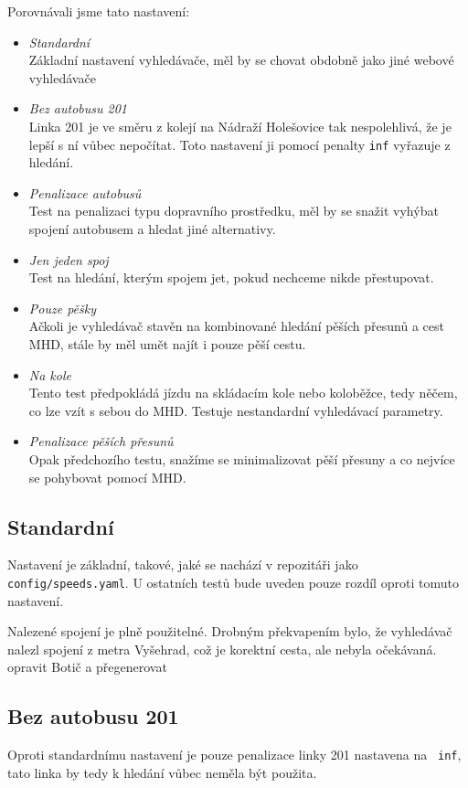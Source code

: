 Porovnávali jsme tato nastavení:
\begin{itemize}
	\item {\em Standardní}\\Základní nastavení vyhledávače, měl by se chovat
	obdobně jako jiné webové vyhledávače
	\item {\em Bez autobusu 201}\\ Linka 201 je ve směru z kolejí na Nádraží
	Holešovice tak nespolehlivá, že je lepší s ní vůbec nepočítat. Toto
	nastavení ji pomocí penalty {\tt inf} vyřazuje z hledání.
	\item {\em Penalizace autobusů}\\ Test na penalizaci typu dopravního
	prostředku, měl by se snažit vyhýbat spojení autobusem a hledat jiné
	alternativy.
	\item {\em Jen jeden spoj}\\ Test na hledání, kterým spojem jet, pokud
	nechceme nikde přestupovat.
	\item {\em Pouze pěšky}\\ Ačkoli je vyhledávač stavěn na kombinované hledání
	pěších přesunů a cest MHD, stále by měl umět najít i pouze pěší cestu.
	\item {\em Na kole}\\ Tento test předpokládá jízdu na skládacím kole nebo
	koloběžce, tedy něčem, co lze vzít s sebou do MHD. Testuje nestandardní
	vyhledávací parametry.
	\item {\em Penalizace pěších přesunů}\\ Opak předchozího testu, snažíme se
	minimalizovat pěší přesuny a co nejvíce se pohybovat pomocí MHD.
\end{itemize}
\subsection{Standardní}
Nastavení je základní, takové, jaké se nachází v repozitáři jako {\tt
config/speeds.yaml}. U ostatních testů bude uveden pouze rozdíl oproti tomuto
nastavení.

Nalezené spojení je plně použitelné. Drobným překvapením bylo, že vyhledávač
nalezl spojení z metra Vyšehrad, což je korektní cesta, ale nebyla očekávaná.
\TODO opravit Botič a přegenerovat
\subsection{Bez autobusu 201}
Oproti standardnímu nastavení je pouze penalizace linky 201 nastavena na {\tt
inf}, tato linka by tedy k hledání vůbec neměla být použita.

